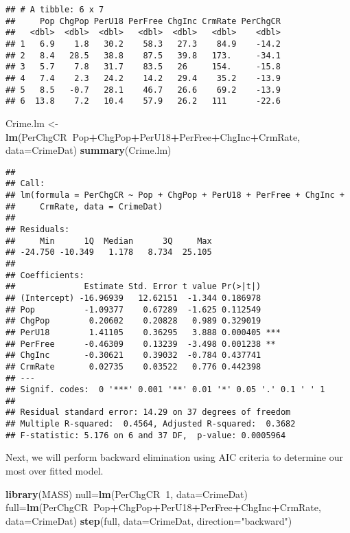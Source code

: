 \documentclass[]{article}
\newenvironment{Shaded}{\begin{snugshade}}{\end{snugshade}}
\newcommand{\KeywordTok}[1]{\textcolor[rgb]{0.13,0.29,0.53}{\textbf{#1}}}
\newcommand{\DataTypeTok}[1]{\textcolor[rgb]{0.13,0.29,0.53}{#1}}
\newcommand{\DecValTok}[1]{\textcolor[rgb]{0.00,0.00,0.81}{#1}}
\newcommand{\StringTok}[1]{\textcolor[rgb]{0.31,0.60,0.02}{#1}}
\newcommand{\OperatorTok}[1]{\textcolor[rgb]{0.81,0.36,0.00}{\textbf{#1}}}
\newcommand{\NormalTok}[1]{#1}
\begin{document}
\begin{verbatim}
## # A tibble: 6 x 7
##     Pop ChgPop PerU18 PerFree ChgInc CrmRate PerChgCR
##   <dbl>  <dbl>  <dbl>   <dbl>  <dbl>   <dbl>    <dbl>
## 1   6.9    1.8   30.2    58.3   27.3    84.9    -14.2
## 2   8.4   28.5   38.8    87.5   39.8   173.     -34.1
## 3   5.7    7.8   31.7    83.5   26     154.     -15.8
## 4   7.4    2.3   24.2    14.2   29.4    35.2    -13.9
## 5   8.5   -0.7   28.1    46.7   26.6    69.2    -13.9
## 6  13.8    7.2   10.4    57.9   26.2   111      -22.6
\end{verbatim}

\begin{Shaded}
\begin{Highlighting}[]
\NormalTok{Crime.lm <-}\StringTok{ }\KeywordTok{lm}\NormalTok{(PerChgCR}\OperatorTok{~}\NormalTok{Pop}\OperatorTok{+}\NormalTok{ChgPop}\OperatorTok{+}\NormalTok{PerU18}\OperatorTok{+}\NormalTok{PerFree}\OperatorTok{+}\NormalTok{ChgInc}\OperatorTok{+}\NormalTok{CrmRate, }\DataTypeTok{data=}\NormalTok{CrimeDat)}
\KeywordTok{summary}\NormalTok{(Crime.lm)}
\end{Highlighting}
\end{Shaded}

\begin{verbatim}
## 
## Call:
## lm(formula = PerChgCR ~ Pop + ChgPop + PerU18 + PerFree + ChgInc + 
##     CrmRate, data = CrimeDat)
## 
## Residuals:
##     Min      1Q  Median      3Q     Max 
## -24.750 -10.349   1.178   8.734  25.105 
## 
## Coefficients:
##              Estimate Std. Error t value Pr(>|t|)    
## (Intercept) -16.96939   12.62151  -1.344 0.186978    
## Pop          -1.09377    0.67289  -1.625 0.112549    
## ChgPop        0.20602    0.20828   0.989 0.329019    
## PerU18        1.41105    0.36295   3.888 0.000405 ***
## PerFree      -0.46309    0.13239  -3.498 0.001238 ** 
## ChgInc       -0.30621    0.39032  -0.784 0.437741    
## CrmRate       0.02735    0.03522   0.776 0.442398    
## ---
## Signif. codes:  0 '***' 0.001 '**' 0.01 '*' 0.05 '.' 0.1 ' ' 1
## 
## Residual standard error: 14.29 on 37 degrees of freedom
## Multiple R-squared:  0.4564, Adjusted R-squared:  0.3682 
## F-statistic: 5.176 on 6 and 37 DF,  p-value: 0.0005964
\end{verbatim}

Next, we will perform backward elimination using AIC criteria to
determine our most over fitted model.

\begin{Shaded}
\begin{Highlighting}[]
\KeywordTok{library}\NormalTok{(MASS)}
\NormalTok{null=}\KeywordTok{lm}\NormalTok{(PerChgCR}\OperatorTok{~}\DecValTok{1}\NormalTok{, }\DataTypeTok{data=}\NormalTok{CrimeDat)}
\NormalTok{full=}\KeywordTok{lm}\NormalTok{(PerChgCR}\OperatorTok{~}\NormalTok{Pop}\OperatorTok{+}\NormalTok{ChgPop}\OperatorTok{+}\NormalTok{PerU18}\OperatorTok{+}\NormalTok{PerFree}\OperatorTok{+}\NormalTok{ChgInc}\OperatorTok{+}\NormalTok{CrmRate, }\DataTypeTok{data=}\NormalTok{CrimeDat)}
\KeywordTok{step}\NormalTok{(full, }\DataTypeTok{data=}\NormalTok{CrimeDat, }\DataTypeTok{direction=}\StringTok{"backward"}\NormalTok{)}
\end{Highlighting}
\end{Shaded}
\end{document}
